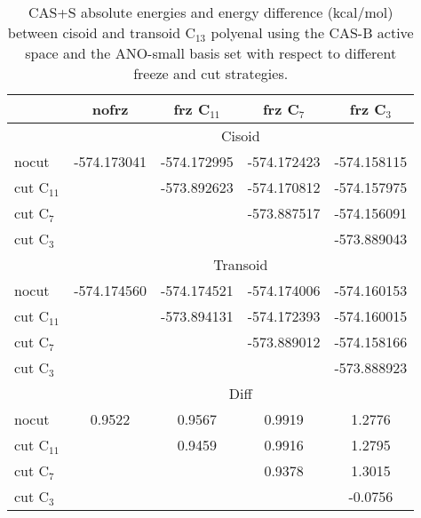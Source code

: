 \begin{center}
\begin{table}[!ht]
\footnotesize
\begin{center}
\begin{tabular}{lcccc}
\hline
       &    nofrz       &    frz C$_{11}$      &   frz C$_{7}$        &   frz
C$_{3}$      \\
\hline                                                      
			&	\multicolumn{4}{c}{Cisoid} \\
nocut		&  -574.173041   &  -574.172995    	&  -574.172423   & -574.158115   \\
cut C$_{11}$&             	 &  -573.892623    	&  -574.170812   & -574.157975   \\
cut C$_{7}$	&             	 &                	&  -573.887517   & -574.156091   \\
cut C$_{3}$	&             	 &					&                & -573.889043  	\\
			&	\multicolumn{4}{c}{Transoid} \\
nocut		&	-574.174560  	&	-574.174521  	&	-574.174006  	& -574.160153   \\
cut C$_{11}$&	             	&	-573.894131  	&	-574.172393  	& -574.160015   \\
cut C$_{7}$	&					&					&	-573.889012  	& -574.158166   \\
cut C$_{3}$	&					&					&					& -573.888923  	\\
			&	\multicolumn{4}{c}{Diff} \\
nocut			& 0.9522    &	0.9567    	&	0.9919    	&	1.2776    \\
cut C$_{11}$	&			&  	0.9459    	&	0.9916    	&	1.2795    \\
cut C$_{7}$		&			&				&  	0.9378    	&	1.3015    \\
cut C$_{3}$		&			&				&				&  -0.0756    \\
\hline
\end{tabular}
\end{center}
\caption{\footnotesize CAS+S absolute energies and energy difference
(kcal/mol) between cisoid and transoid C$_{13}$ polyenal using the CAS-B
active space and the ANO-small basis set with respect to different freeze
and cut strategies.}
\label{tbl:C13-cis-trans-diff-casb}
\end{table}
\end{center}

